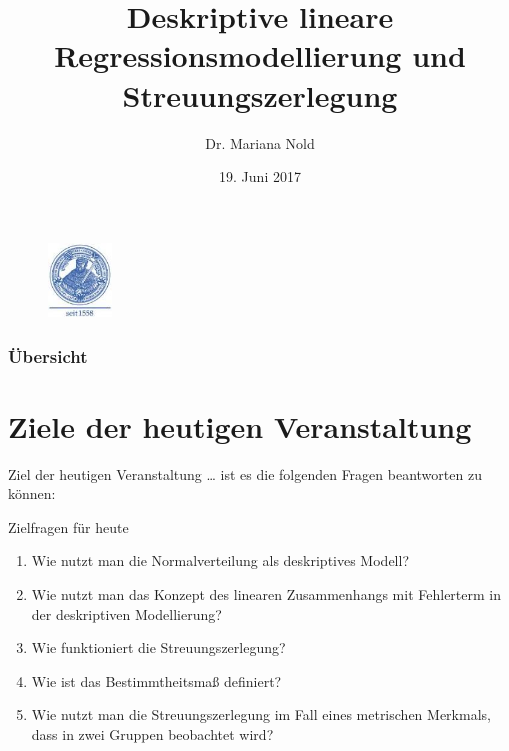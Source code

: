 \documentclass[usenames,dvipsnames,handout]{beamer}
\begin{document}
\author[Dr. Mariana Nold]{Dr. Mariana Nold}
 \date{}
\title [Deskriptive lineare Regressionsmodellierung und Streuungszerlegung]{Deskriptive lineare Regressionsmodellierung und  Streuungszerlegung}
\date{19. Juni 2017}
\begin{frame}
\maketitle

  \begin{figure}[ht]
 	\centering
 	      \includegraphics[width=0.15\textwidth]{index.jpeg}
 	\end{figure}
\end{frame}

\begin{frame}
  \frametitle{Übersicht}
  \tableofcontents
\end{frame}

\section{Ziele der heutigen Veranstaltung}
\begin{frame}{Ziel der heutigen Veranstaltung \dots}
ist es die folgenden Fragen beantworten zu können:
\begin{block}{Zielfragen für heute}
\begin{enumerate}
\item{Wie nutzt man die Normalverteilung als deskriptives Modell?}
\item{Wie nutzt man das Konzept des linearen Zusammenhangs mit Fehlerterm in der
deskriptiven Modellierung?}
\item{Wie funktioniert die Streuungszerlegung?}
\item{Wie ist das Bestimmtheitsmaß definiert?}
\item{Wie nutzt man die Streuungszerlegung im Fall eines metrischen Merkmals,
dass in zwei Gruppen beobachtet wird?}
\end{enumerate}
\end{block}
\end{frame}
\end{document}
